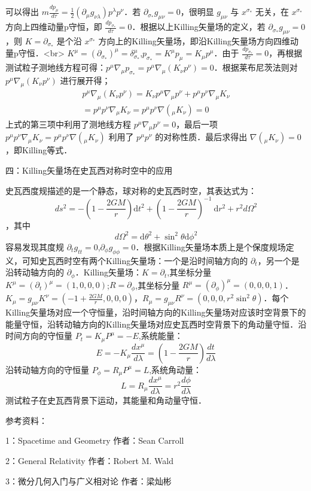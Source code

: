 可以得出 $m\frac{d p_{\mu}}{d \tau}=\frac{1}{2}\left(\partial_{\mu} g_{\nu \lambda}\right) p^{\lambda} p^{\nu}$．若 $\partial_{\sigma_{*}} g_{\mu \nu}=0$，很明显 $g_{\mu \nu}$ 与 $x^{\sigma_{*}}$ 无关，在 $x^{\sigma_{*}}$ 方向上四维动量p守恒，即 $\frac{d p_{\sigma_{*}}}{d \tau}=0$．根据以上Killing矢量场的定义，若 $\partial_{\sigma_{*}} g_{\mu \nu}=0$，则 $K=\partial_{\sigma_{*}}$ 是个沿 $x^{\sigma_{*}}$ 方向上的Killing矢量场，即沿Killing矢量场方向四维动量p守恒．<br>
$K^{\mu}=(\partial_{\sigma_{*}})^{\mu}=\delta_{\sigma_{*}}^{\mu}$,$p_{\sigma_{*}}=K^{\mu}p_{\mu}=K_{\mu}p^{\mu}$．由于 $\frac{d p_{\sigma_{*}}}{d \tau}=0$，再根据测试粒子测地线方程可得：$p^{\mu} \nabla_{\mu} p_{\sigma_{*}}=p^{\mu} \nabla_{\mu}(K_{\nu}p^{\nu}) =0$．根据莱布尼茨法则对 $p^{\mu} \nabla_{\mu}(K_{\nu}p^{\nu})$ 进行展开得；
$$\begin{aligned}
p^{\mu} \nabla_{\mu}(K_{\nu}p^{\nu})=K_{\nu}p^{\mu} \nabla_{\mu}p^{\nu}+p^{\mu} p^{\nu}\nabla_{\mu}K_{\nu}\\
=p^{\mu} p^{\nu}\nabla_{\mu}K_{\nu}=p^{\mu} p^{\nu}\nabla(_{\mu}K_{\nu})=0
\end{aligned}$$
上式的第三项中利用了测地线方程 $p^{\mu} \nabla_{\mu}p^{\nu}=0$，最后一项 $p^{\mu} p^{\nu}\nabla_{\mu}K_{\nu}=p^{\mu} p^{\nu}\nabla(_{\mu}K_{\nu})$ 利用了 $p^{\mu} p^{\nu}$ 的对称性质．最后求得出 $\nabla(_{\mu}K_{\nu})=0$，即Killing等式．

四：Killing矢量场在史瓦西对称时空中的应用

史瓦西度规描述的是一个静态，球对称的史瓦西时空，其表达式为：
$$d s^{2}=-\left(1-\frac{2 G M}{r}\right) \mathrm{d} t^{2}+\left(1-\frac{2 G M}{r}\right)^{-1} \mathrm{~d} r^{2}+r^{2} d \Omega^{2}$$，其中$$d \Omega^{2}=\mathrm{d} \theta^{2}+\sin ^{2} \theta \mathrm{d} \phi^{2}$$
容易发现其度规 $\partial_{t} g_{tt}=0$,$\partial_{\phi} g_{\phi\phi}=0$．根据Killing矢量场本质上是个保度规场定义，可知史瓦西时空有两个Killing矢量场：一个是沿时间轴方向的 $\partial_{t}$，另一个是沿转动轴方向的 $\partial_{\phi}$．Killing矢量场：$K=\partial_{t}$,其坐标分量 $K^{\mu}=\left(\partial_{t}\right)^{\mu}=(1,0,0,0)$;$R=\partial_{\phi}$,其坐标分量 $R^{\mu}=\left(\partial_{\phi}\right)^{\mu}=(0,0,0,1)$．$K_{\mu}=g_{\mu \nu}K^{\nu}=(-1+\frac{2 G M}{r},0,0,0)$，$R_{\mu}=g_{\mu \nu}R^{\nu}=(0,0,0,r^{2}\sin ^{2} \theta )$．每个Killing矢量场对应一个守恒量，沿时间轴方向的Killing矢量场对应该时空背景下的能量守恒，沿转动轴方向的Killing矢量场对应史瓦西时空背景下的角动量守恒．沿时间方向的守恒量 $P_{t}=K_{\mu}P^{\mu}=-E$,系统能量：$$E=-K_{\mu} \frac{d x^{\mu}}{d \lambda}=\left(1-\frac{2 G M}{r}\right) \frac{d t}{d \lambda}$$
沿转动轴方向的守恒量 $P_{\phi}=R_{\mu}P^{\mu}=L$,系统角动量：$$L=R_{\mu} \frac{d x^{\mu}}{d \lambda}=r^{2} \frac{d \phi}{d \lambda}$$
测试粒子在史瓦西背景下运动，其能量和角动量守恒．

参考资料：

1：Spacetime and Geometry 作者：Sean Carroll

2：General Relativity   作者：Robert M. Wald

3：微分几何入门与广义相对论  作者：梁灿彬